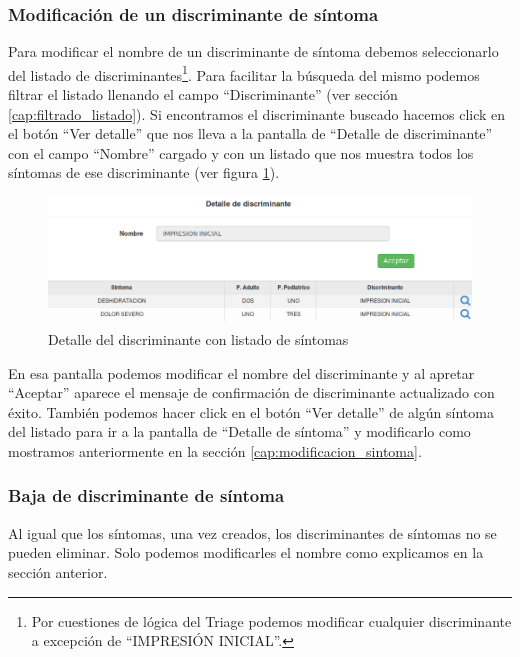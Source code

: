 \subsubsection{Modificación de un discriminante de síntoma}
Para modificar el nombre de un discriminante de síntoma debemos seleccionarlo del listado de discriminantes\footnote{Por cuestiones de lógica del Triage podemos modificar cualquier discriminante a excepción de ``IMPRESIÓN INICIAL''.}. Para facilitar la búsqueda del mismo podemos filtrar el listado llenando el campo ``Discriminante'' (ver sección \ref{cap:filtrado_listado}). Si encontramos el discriminante buscado hacemos click en el botón ``Ver detalle'' que nos lleva a la pantalla de ``Detalle de discriminante'' con el campo ``Nombre'' cargado y con un listado que nos muestra todos los síntomas de ese discriminante (ver figura \ref{fig:detalle_discriminante}).
\begin{figure}
\centerline{\includegraphics[width=1\textwidth]{listado_sintomas_de_discriminante.png}}
\caption{Detalle del discriminante con listado de síntomas}
\label{fig:detalle_discriminante}
\end{figure}
En esa pantalla podemos modificar el nombre del discriminante y al apretar ``Aceptar'' aparece el mensaje de confirmación de discriminante actualizado con éxito. También podemos hacer click en el botón ``Ver detalle'' de algún síntoma del listado para ir a la pantalla de ``Detalle de síntoma'' y modificarlo como mostramos anteriormente en la sección \ref{cap:modificacion_sintoma}.

\subsubsection{Baja de discriminante de síntoma}
Al igual que los síntomas, una vez creados, los discriminantes de síntomas no se pueden eliminar. Solo podemos modificarles el nombre como explicamos en la sección anterior.

